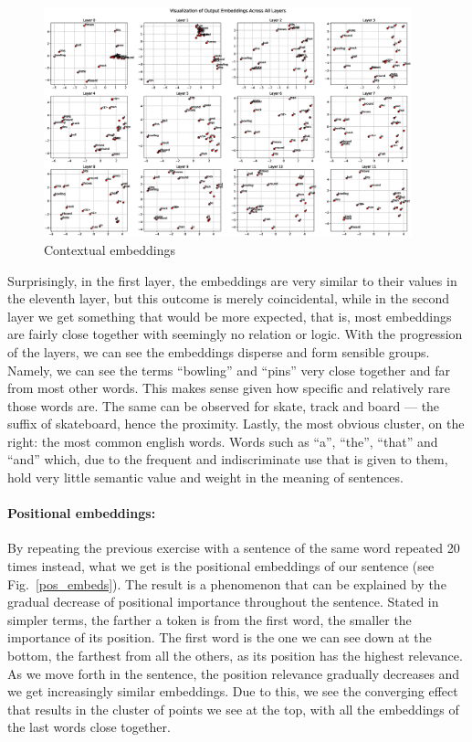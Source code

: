 \documentclass[runningheads]{llncs}
\begin{document}
\begin{figure}
\includegraphics[width=0.95\textwidth]{../figures/hidden_layers.eps}
\caption{Contextual embeddings}\label{hidden_layers}
\end{figure}

Surprisingly, in the first layer, the embeddings are very similar to their values in the eleventh layer, but this outcome is merely coincidental, while in the second layer we get something that would be more expected, that is, most embeddings are fairly close together with seemingly no relation or logic. With the progression of the layers, we can see the embeddings disperse and form sensible groups. Namely, we can see the terms ``bowling'' and ``pins'' very close together and far from most other words. This makes sense given how specific and relatively rare those words are. The same can be observed for skate, track and board --- the suffix of skateboard, hence the proximity. Lastly, the most obvious cluster, on the right: the most common english words. Words such as ``a'', ``the'', ``that'' and ``and'' which, due to the frequent and indiscriminate use that is given to them, hold very little semantic value and weight in the meaning of sentences.

\paragraph{Positional embeddings:}By repeating the previous exercise with a sentence of the same word repeated 20 times instead, what we get is the positional embeddings of our sentence (see Fig.~\ref{pos_embeds}). The result is a phenomenon that can be explained by the gradual decrease of positional importance throughout the sentence. Stated in simpler terms, the farther a token is from the first word, the smaller the importance of its position. The first word is the one we can see down at the bottom, the farthest from all the others, as its position has the highest relevance. As we move forth in the sentence, the position relevance gradually decreases and we get increasingly similar embeddings. Due to this, we see the converging effect that results in the cluster of points we see at the top, with all the embeddings of the last words close together.
\end{document}
